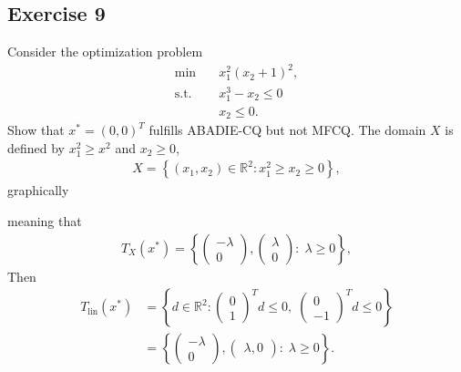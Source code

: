 \subsection{Exercise 9}
Consider the optimization problem
\begin{align}
    \text{min}\quad & x_1^{2}\left( x_2 + 1 \right)^{2} ,\\
    \text{s.t.}\quad &x_1^{3} - x_2 \le 0\\
    & x_2 \le 0.
\end{align}
Show that $x^{*} = (0, 0)^{T}$ fulfills ABADIE-CQ but not MFCQ.
\newline
The domain $X$ is defined by $x_1^2 \ge x^2$ and $x_2 \ge 0$,
\begin{align}
    X = \left\{ (x_1, x_2) \in \mathbb{R}^{2}: x_1^{2}\ge x_2 \ge 0 \right\},
\end{align}
graphically
\begin{figure}[H]
    \centering
    \label{fig: ex9}
\end{figure}
meaning that
\begin{align}
    T_X(x^{*}) = \left\{\begin{pmatrix} -\lambda \\ 0 \end{pmatrix},
    \begin{pmatrix} \lambda \\ 0 \end{pmatrix}:\; \lambda \ge 0   \right\},
\end{align}
Then
\begin{align}
    T_\text{lin}(x^{*})
    &= \left\{d\in\mathbb{R}^{2}: \begin{pmatrix} 0\\1
    \end{pmatrix}^{T}d \le 0,\; \begin{pmatrix} 0 \\ -1
\end{pmatrix}^{T}d\le 0  \right\} \\
    &= \left\{ \begin{pmatrix} -\lambda \\ 0 \end{pmatrix}, \begin{pmatrix}
\lambda , 0 \end{pmatrix}:\; \lambda \ge 0   \right\}.
\end{align}
